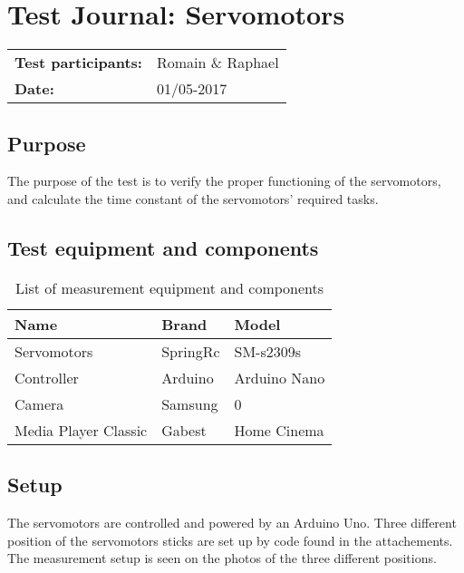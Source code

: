 \graphicspath{{figures/design/}}


\chapter{Test Journal: Servomotors}
\label{ssc:Servomotors}

\begin{table}[!h]
\begin{tabular}{l l}
\textbf{Test participants:} & Romain \& Raphael   \\
\textbf{Date:}  & 01/05-2017
\end{tabular}
\end{table}

\section*{Purpose}
	
The purpose of the test is to verify the proper functioning of the servomotors, and calculate the time constant of the servomotors' required tasks.
	
\section*{Test equipment and components}


\begin{table}[htbp]
	\centering
	\caption{List of measurement equipment and components}\label{tab_appendix:Servo_equip2}
	
	\begin{tabularx}{\textwidth}{lXX}
		Name & Brand	& Model \\ \toprule 
		Servomotors	& SpringRc & SM-s2309s 	\\ \rowcolor{lightGrey}
		Controller	& Arduino & Arduino Nano \\ 
		Camera & Samsung & 0 \\ \rowcolor{lightGrey}
		Media Player Classic & Gabest & Home Cinema\\ 
	\end{tabularx}
\end{table}




	\section*{Setup}
	
The servomotors are controlled and powered by an Arduino Uno. Three different position of the servomotors sticks are set up by code found in the attachements. The measurement setup is seen on the photos of the three different positions. \

